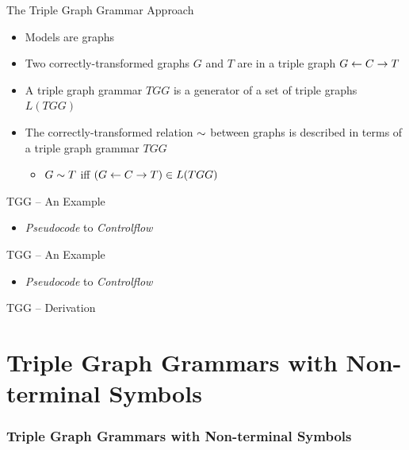 \documentclass[usenames,dvipsnames]{beamer}
\begin{document}
	\begin{frame}{The Triple Graph Grammar Approach}
		\begin{itemize}
			\item Models are graphs
			\pause
			\item Two correctly-transformed graphs $G$ and $T$ are in a triple graph $G \overset{}{\leftarrow} C \overset{}{\rightarrow} T$\\
			
			\pause
			\item A triple graph grammar $TGG$ is a generator of a set of triple graphs $L(TGG)$
			\pause
			\item The correctly-transformed relation $\sim$ between graphs is described in terms of a triple graph grammar $TGG$
			\begin{itemize}
				\item $G \sim T $ iff $(G \overset{}{\leftarrow} C \overset{}{\rightarrow} T) \in L(TGG)$
			\end{itemize}
		\end{itemize}
	\end{frame}
	
	\begin{frame}{TGG -- An Example}
		\begin{itemize}
			\item \emph{Pseudocode} to \emph{Controlflow}
		\end{itemize}
		
		
	\end{frame}
	
	\begin{frame}{TGG -- An Example}
		\begin{itemize}
			\item \emph{Pseudocode} to \emph{Controlflow}
		\end{itemize}
			
		
	\end{frame}
	
	\begin{frame}{TGG -- Derivation}
		
	\end{frame}
	
	\section{Triple Graph Grammars with Non-terminal Symbols}
	\begin{frame}
		\frametitle{Triple Graph Grammars with Non-terminal Symbols}
	\end{frame}
	
\end{document}
